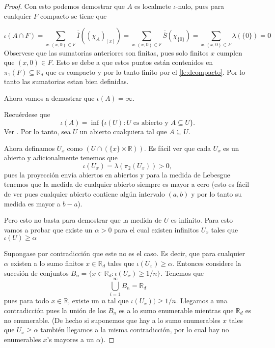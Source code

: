\documentclass[letter,twoside,12pt]{article}
\numberwithin{equation}{section}
\begin{document}
\begin{enumerate}[label = (\textbf{\arabic*.})]
\begin{enumerate}[label = (\textbf{\roman*.})]
\begin{proof}
Con esto podemos demostrar que $A$ es localmete $ \iota $-nulo, pues para cualquier $F$ compacto se tiene que

$$ \iota(A \cap F) = \sum_{x: (x,0) \in F } \overline{\overline{I}}((\chi_A)_{[x]}) = \sum_{x: (x,0) \in F } \overline{\overline{S}}(\chi_{\{0\}}) = \sum_{x: (x,0) \in F } \lambda(\{0\}) =  0 $$ 
Observese que las sumatorias anteriores son finitas, pues solo finitos $ x $ cumplen que $(x,0) \in F $. Esto se debe a que estos puntos están contenidos en $\pi_1(F) \subseteq \mathbb{R}_d $ que es compacto y por lo tanto finito por el \autoref{le:dcompacto}. Por lo tanto las sumatorias estan bien definidas.

Ahora vamos a demostrar que $\iota(A) = \infty $.

Recuérdese que 
\begin{equation}
\iota(A) = \inf\{\iota(U): U \text{ es abierto y } A \subseteq U \}. \label{eq:abiertos}
\end{equation}
Ver \cite[Teorema 9.24]{hewitt}. Por lo tanto, sea $U$ un abierto cualquiera tal que $A \subseteq U $.

Ahora definamos $ U_x $ como $ (U \cap (\{x\} \times \mathbb{R}))$. Es fácil ver que cada $U_x$ es un abierto y adicionalmente tenemos que 
$$\iota(U_x) = \lambda({\pi_2(U_x)}) > 0, $$ pues la proyección envía abiertos en abiertos y para la medida de Lebesgue tenemos que la medida de cualquier abierto siempre es mayor a cero (esto es fácil de ver pues cualquier abierto contiene algún intervalo $ (a,b) $ y por lo tanto su medida es mayor a $b-a$).

Pero esto no basta para demostrar que la medida de $U$ es infinito. Para esto vamos a probar que existe un $\alpha > 0 $ para el cual existen infinitos $U_x $ tales que $\iota(U)\geq\alpha$

Supongase por contradicción que este no es el caso. Es decir, que para cualquier $\alpha $ existen a lo sumo finitos $x \in \mathbb{R}_d$ tales que $\iota(U_x) \geq \alpha $. Entonces considere la sucesión de conjuntos $B_n = \{x \in \mathbb{R}_d: \iota(U_x) \geq 1/n  \}$. Tenemos que 
$$ \bigcup_{i=1}^\infty B_n = \mathbb{R}_d $$ pues para todo $ x \in \mathbb{R}$, existe un $n$ tal que $ \iota(U_x)) \geq 1/n $. Llegamos a una contradicción pues la unión de los $ B_n $ es a lo sumo enumerable mientras que $ \mathbb{R}_d $ es no enumerable. (De hecho si suponemos que hay a lo sumo enumerables $x$ tales que $U_x \geq \alpha $ también llegamos a la misma contradicción, por lo cual hay no enumerables $x$'s mayores a un $\alpha$).


\end{proof}
\end{enumerate}
\end{enumerate}
\end{document}
